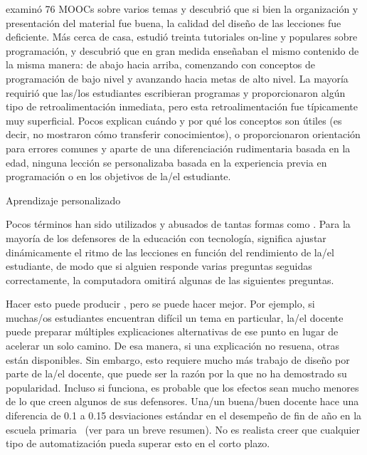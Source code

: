 \cite{Marg2015} examinó 76 MOOCs sobre varios temas y descubrió que
si bien la organización y presentación del material fue buena,
la calidad del diseño de las lecciones fue deficiente.
Más cerca de casa,
\cite{Kim2017} estudió treinta tutoriales on-line y populares sobre programación,
y descubrió que en gran medida enseñaban el mismo contenido de la misma manera:
de abajo hacia arriba,
comenzando con conceptos de programación de bajo nivel y avanzando hacia metas de alto nivel.
La mayoría requirió que las/los estudiantes escribieran programas y proporcionaron algún tipo de retroalimentación inmediata,
pero esta retroalimentación fue típicamente muy superficial.
Pocos explican cuándo y por qué los conceptos son útiles
(es decir, no mostraron cómo transferir conocimientos),
o proporcionaron orientación para errores comunes
y aparte de una diferenciación rudimentaria basada en la edad,
ninguna lección se personalizaba basada en la experiencia previa en programación o en los objetivos de la/el estudiante.

\begin{aside}{Aprendizaje personalizado}

  Pocos términos han sido utilizados y abusados ​​de tantas formas
  como .
  Para la mayoría de los defensores de la educación con tecnología,
  significa ajustar dinámicamente el ritmo de las lecciones en función del rendimiento de la/el estudiante,
  de modo que si alguien responde varias preguntas seguidas correctamente,
  la computadora omitirá algunas de las siguientes preguntas.

  Hacer esto puede producir
  ,
  pero se puede hacer mejor.
  Por ejemplo,
  si muchas/os estudiantes encuentran difícil un tema en particular,
  la/el docente puede preparar múltiples explicaciones alternativas de ese punto
  en lugar de acelerar un solo camino.
  De esa manera,
  si una explicación no resuena,
  otras están disponibles.
  Sin embargo,
  esto requiere mucho más trabajo de diseño por parte de la/el docente,
  que puede ser la razón por la que no ha demostrado su popularidad.
  Incluso si funciona,
  es probable que los efectos sean mucho menores de lo que creen algunos de sus defensores.
  Una/un buena/buen docente hace una diferencia de 0.1 a 0.15 desviaciones estándar en el desempeño de fin de año en la escuela primaria~\cite{Chet2014}
  (ver  para un breve resumen).
  No es realista creer que cualquier tipo de automatización pueda superar esto en el corto plazo.
\end{aside}

